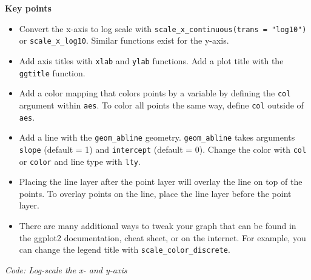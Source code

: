 \documentclass[
]{article}
\newenvironment{Shaded}{\begin{snugshade}}{\end{snugshade}}
\newcommand{\CommentTok}[1]{\textcolor[rgb]{0.56,0.35,0.01}{\textit{#1}}}
\newcommand{\DataTypeTok}[1]{\textcolor[rgb]{0.13,0.29,0.53}{#1}}
\newcommand{\DecValTok}[1]{\textcolor[rgb]{0.00,0.00,0.81}{#1}}
\newcommand{\FloatTok}[1]{\textcolor[rgb]{0.00,0.00,0.81}{#1}}
\newcommand{\KeywordTok}[1]{\textcolor[rgb]{0.13,0.29,0.53}{\textbf{#1}}}
\newcommand{\NormalTok}[1]{#1}
\newcommand{\OperatorTok}[1]{\textcolor[rgb]{0.81,0.36,0.00}{\textbf{#1}}}
\newcommand{\StringTok}[1]{\textcolor[rgb]{0.31,0.60,0.02}{#1}}
\providecommand{\tightlist}{%
  \setlength{\itemsep}{0pt}\setlength{\parskip}{0pt}}
\begin{document}
\textbf{Key points}

\begin{itemize}
\tightlist
\item
  Convert the x-axis to log scale with
  \texttt{scale\_x\_continuous(trans\ =\ "log10")} or
  \texttt{scale\_x\_log10}. Similar functions exist for the y-axis.
\item
  Add axis titles with \texttt{xlab} and \texttt{ylab} functions. Add a
  plot title with the \texttt{ggtitle} function.
\item
  Add a color mapping that colors points by a variable by defining the
  \texttt{col} argument within \texttt{aes}. To color all points the
  same way, define \texttt{col} outside of \texttt{aes}.
\item
  Add a line with the \texttt{geom\_abline} geometry.
  \texttt{geom\_abline} takes arguments \texttt{slope} (default = 1) and
  \texttt{intercept} (default = 0). Change the color with \texttt{col}
  or \texttt{color} and line type with \texttt{lty}.
\item
  Placing the line layer after the point layer will overlay the line on
  top of the points. To overlay points on the line, place the line layer
  before the point layer.
\item
  There are many additional ways to tweak your graph that can be found
  in the ggplot2 documentation, cheat sheet, or on the internet. For
  example, you can change the legend title with
  \texttt{scale\_color\_discrete}.
\end{itemize}

\emph{Code: Log-scale the x- and y-axis}

\begin{Shaded}
\end{Shaded}
\end{document}
